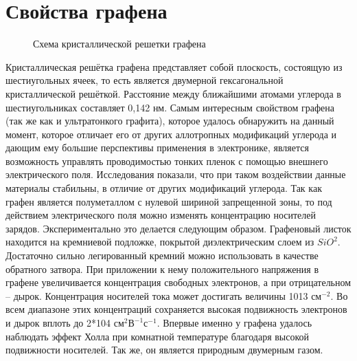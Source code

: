 \documentclass[a4paper,12pt]{article} %
\begin{document}
\section{Свойства графена}
\begin{figure}[h!]
\caption{Схема кристаллической решетки графена}
\end{figure}
\noindent Кристаллическая решётка графена представляет собой плоскость, состоящую из шестиугольных ячеек, то есть является двумерной гексагональной кристаллической решёткой. Расстояние между ближайшими атомами углерода в шестиугольниках составляет 0,142 нм.
\medskip
\noindent Самым интересным свойством графена (так же как и ультратонкого графита), которое удалось обнаружить на данный момент, которое отличает его от других аллотропных модификаций углерода и дающим ему большие перспективы применения в электронике, является возможность управлять проводимостью тонких пленок с помощью внешнего электрического поля. Исследования показали, что при таком воздействии данные материалы стабильны, в отличие от других модификаций углерода.
\medskip
\noindent Так как графен является полуметаллом с нулевой шириной запрещенной зоны, то под действием электрического поля можно изменять концентрацию носителей зарядов. Экспериментально это делается следующим образом. Графеновый листок находится на кремниевой подложке, покрытой диэлектрическим слоем из $SiO^{2}$. Достаточно сильно легированный кремний можно использовать в качестве обратного затвора. При приложении к нему положительного напряжения в графене увеличивается концентрация свободных электронов, а при отрицательном – дырок. Концентрация носителей тока может достигать величины 1013 $\text{см}^{-2}$. Во всем диапазоне этих концентраций сохраняется высокая подвижность электронов и дырок вплоть до 2*104 $\text{см}^{2}\text{В}^{-1}\text{с}^{-1}$.
\medskip
\noindent Впервые именно у графена удалось наблюдать эффект Холла при комнатной температуре благодаря высокой подвижности носителей. Так же, он является природным двумерным газом.
\end{document}
